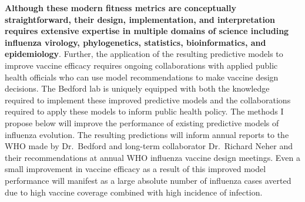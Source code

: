 \textbf{Although these modern fitness metrics are conceptually straightforward, their design, implementation, and interpretation requires extensive expertise in multiple domains of science including influenza virology, phylogenetics, statistics, bioinformatics, and epidemiology}.
Further, the application of the resulting predictive models to improve vaccine efficacy requires ongoing collaborations with applied public health officials who can use model recommendations to make vaccine design decisions.
The Bedford lab is uniquely equipped with both the knowledge required to implement these improved predictive models and the collaborations required to apply these models to inform public health policy.
The methods I propose below will improve the performance of existing predictive models of influenza evolution.
The resulting predictions will inform annual reports to the WHO made by Dr.\ Bedford and long-term collaborator Dr.\ Richard Neher \cite{Bedford113035,Bedford271114} and their recommendations at annual WHO influenza vaccine design meetings.
Even a small improvement in vaccine efficacy as a result of this improved model performance will manifest as a large absolute number of influenza cases averted due to high vaccine coverage combined with high incidence of infection.

